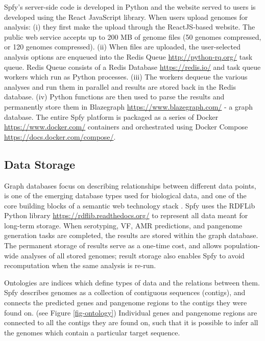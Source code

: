 \documentclass[a4,center,fleqn]{NAR}
\begin{document}
Spfy's server-side code is developed in Python and the website served to users is developed using the React JavaScript library.
When users upload genomes for analysis: (i) they first make the upload through the ReactJS-based website. 
The public web service accepts up to 200 MB of genome files (50 genomes compressed, or 120 genomes compressed).
(ii) When files are uploaded, the user-selected analysis options are enqueued into the Redis Queue \url{http://python-rq.org/} task queue.
Redis Queue consists of a Redis Database \url{https://redis.io/} and task queue workers which run as Python processes.
(iii) The workers dequeue the various analyses and run them in parallel and results are stored back in the Redis database.
(iv) Python functions are then used to parse the results and permanently store them in Blazegraph \url{https://www.blazegraph.com/} - a graph database.
The entire Spfy platform is packaged as a series of Docker \url{https://www.docker.com/} containers and orchestrated using Docker Compose \url{https://docs.docker.com/compose/}.

\subsection{Data Storage}
Graph databases focus on describing relationships between different data points, is one of the emerging \cite{de2015trends} database types used for biological data, and one of the core building blocks of a semantic web technology stack \cite{horrocks2005semantic}.
Spfy uses the RDFLib Python library \url{https://rdflib.readthedocs.org/} to represent all data meant for long-term storage.
When serotyping, VF, AMR predictions, and pangenome generation tasks are completed, the results are stored within the graph database.
The permanent storage of results serve as a one-time cost, and allows population-wide analyses of all stored genomes; result storage also enables Spfy to avoid recomputation when the same analysis is re-run.

Ontologies are indices which define types of data and the relations between them.
Spfy describes genomes as a collection of contiguous sequences (contigs), and connects the predicted genes and pangenome regions to the contigs they were found on.
(see Figure \ref{fig-ontology})
Individual genes and pangenome regions are connected to all the contigs they are found on, such that it is possible to infer all the genomes which contain a particular target sequence.
\end{document}

